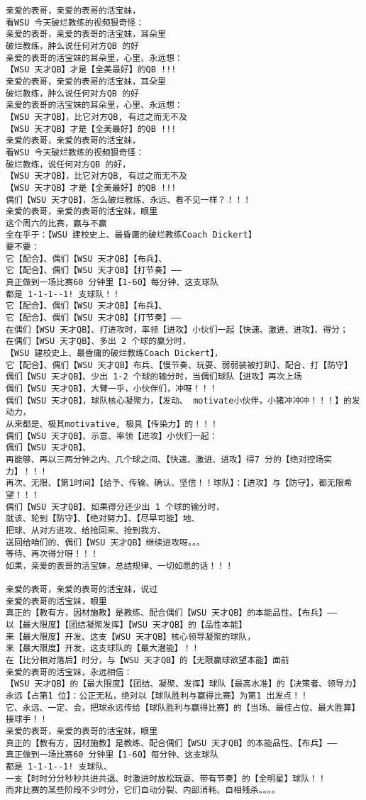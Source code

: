 \documentclass[9pt, b5paper]{article}
\begin{document}
\begin{verbatim}
亲爱的表哥，亲爱的表哥的活宝妹，
看WSU 今天破烂教练的视频狠奇怪：
亲爱的表哥，亲爱的表哥的活宝妹，耳朵里
破烂教练，肿么说任何对方QB 的好
亲爱的表哥的活宝妹的耳朵里，心里、永远想：
【WSU 天才QB】才是【全美最好】的QB !!!
亲爱的表哥，亲爱的表哥的活宝妹，耳朵里
破烂教练，肿么说任何对方QB 的好
亲爱的表哥的活宝妹的耳朵里，心里、永远想：
【WSU 天才QB】，比它对方QB, 有过之而无不及
【WSU 天才QB】才是【全美最好】的QB !!!
亲爱的表哥，亲爱的表哥的活宝妹，
看WSU 今天破烂教练的视频狠奇怪：
破烂教练，说任何对方QB 的好，
【WSU 天才QB】，比它对方QB, 有过之而无不及
【WSU 天才QB】才是【全美最好】的QB !!!
偶们【WSU 天才QB】，怎么破烂教练、永远、看不见一样？！！！
亲爱的表哥，亲爱的表哥的活宝妹，眼里
这个周六的比赛，赢与不赢
全在乎于：【WSU 建校史上、最昏庸的破烂教练Coach Dickert】
要不要：
它【配合】、偶们【WSU 天才QB】【布兵】、
它【配合】、偶们【WSU 天才QB】【打节奏】——
真正做到一场比赛60 分钟里【1-60】每分钟、这支球队
都是 1-1-1--1! 支球队！！
它【配合】、偶们【WSU 天才QB】【布兵】、
它【配合】、偶们【WSU 天才QB】【打节奏】——
在偶们【WSU 天才QB】、打进攻时，率领【进攻】小伙们一起【快速、激进、进攻】、得分；
在偶们【WSU 天才QB】、多出 2 个球的赢分时，
【WSU 建校史上、最昏庸的破烂教练Coach Dickert】，
它【配合】、偶们【WSU 天才QB】布兵、【慢节奏、玩耍、弱弱装被打趴】、配合、打【防守】
偶们【WSU 天才QB】、少出 1-2 个球的输分时，当偶们球队【进攻】再次上场
偶们【WSU 天才QB】，大臂一乎，小伙伴们，冲呀！！！
偶们【WSU 天才QB】，球队核心凝聚力，【发动、 motivate小伙伴，小猪冲冲冲！！！】的发动力，
从来都是、极其motivative, 极具【传染力】的！！！
偶们【WSU 天才QB】、示意、率领【进攻】小伙们一起：
偶们【WSU 天才QB】、
再能够、再以三两分钟之内、几个球之间、【快速、激进、进攻】得7 分的【绝对控场实力】！！！
再次、无限、【第1时间】【给予、传输、确认、坚信！！球队】：【进攻】与【防守】，都无限希望！！！
偶们【WSU 天才QB】、如果得分还少出 1 个球的输分时，
就该、轮到【防守】、【绝对努力】、【尽早可能】地、
把球、从对方进攻、给抢回来、抢到我方、
送回给咱们的、偶们【WSU 天才QB】继续进攻呀。。。
等待、再次得分呀！！！
如果，亲爱的表哥的活宝妹，总结规律、一切如愿的话！！！

亲爱的表哥，亲爱的表哥的活宝妹，说过
亲爱的表哥的活宝妹，眼里
真正的【教有方，因材施教】是教练、配合偶们【WSU 天才QB】的本能品性、【布兵】——
以【最大限度】【团结凝聚发挥】【WSU 天才QB】的【品性本能】
来【最大限度】开发、这支【WSU 天才QB】核心领导凝聚的球队，
来【最大限度】开发，这支球队的【最大潜能】！！
在【比分相对落后】时分，与【WSU 天才QB】的【无限赢球欲望本能】面前
亲爱的表哥的活宝妹，永远相信：
【WSU 天才QB】的【最大限度】【团结、凝聚、发挥】球队【最高水准】的【决策者、领导力】
永远【占第1 位】：公正无私，绝对以【球队胜利与赢得比赛】为第1 出发点！！
它、永远、一定、会，把球永远传给【球队胜利与赢得比赛】的【当场、最佳占位、最大胜算】接球手！！
亲爱的表哥，亲爱的表哥的活宝妹，眼里
真正的【教有方，因材施教】是教练、配合偶们【WSU 天才QB】的本能品性、【布兵】——
真正做到一场比赛60 分钟里【1-60】每分钟、这支球队
都是 1-1-1--1! 支球队、
一支【时时分分秒秒共进共退、时激进时放松玩耍、带有节奏】的【全明星】球队！！
而非比赛的某些阶段不少时分，它们自动分裂、内部消耗、自相残杀。。。。


\end{verbatim}
\end{document}

